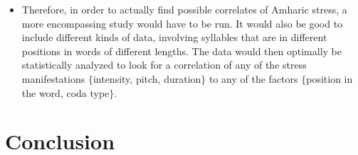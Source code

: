 \documentclass[12pt]{article}
\begin{document}
\begin{itemize}
	\item Therefore, in order to actually find possible correlates of Amharic stress, a more encompassing study would have to be run. It would also be good to include different kinds of data, involving syllables that are in different positions in words of different lengths. The data would then optimally be statistically analyzed to look for a correlation of any of the stress manifestations $\{$intensity, pitch, duration$\}$ to any of the factors $\{$position in the word, coda type$\}$.


\end{itemize}

\section{Conclusion}
\end{document}
